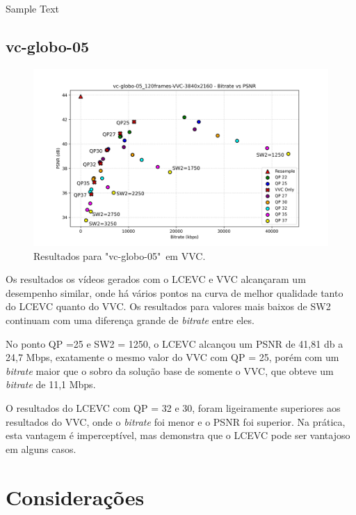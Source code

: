 Sample Text

\newpage

\subsection{vc-globo-05}

\begin{figure}[h]
    \centering
    \includegraphics[width=1.0\textwidth]{img/vc-globo-05_120frames-VVC.png}
    \caption{Resultados para "vc-globo-05"\ em \acrshort{VVC}.}
    \label{fig:vc-globo-05-VVC}
\end{figure}

Os resultados os vídeos gerados com o \acrshort{LCEVC} e \acrshort{VVC} alcançaram
um desempenho similar, onde há vários pontos na curva de melhor qualidade tanto 
do \acrshort{LCEVC} quanto do \acrshort{VVC}. Os resultados para valores mais baixos
de SW2 continuam com uma diferença grande de \textit{bitrate} entre eles.

No ponto QP =25 e SW2 = 1250, o \acrshort{LCEVC} alcançou um \acrshort{PSNR} de 41,81 db
a 24,7 Mbps, exatamente o mesmo valor do \acrshort{VVC} com QP = 25, porém com um
\textit{bitrate} maior que o sobro da solução base de somente o \acrshort{VVC}, que
obteve um \textit{bitrate} de 11,1 Mbps.

O resultados do \acrshort{LCEVC} com QP = 32 e 30, foram ligeiramente superiores
aos resultados do \acrshort{VVC}, onde o \textit{bitrate} foi menor e o \acrshort{PSNR} foi
superior. Na prática, esta vantagem é imperceptível, mas demonstra que o \acrshort{LCEVC}
pode ser vantajoso em alguns casos.

\newpage

\section{Considerações}

